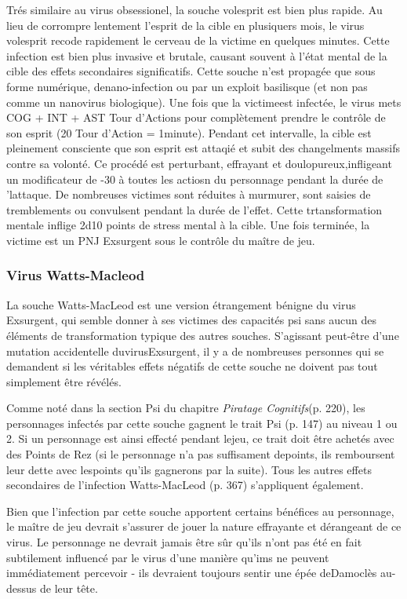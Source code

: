 Trés similaire au virus obsessionel, la souche volesprit est bien plus rapide. Au lieu de corrompre lentement l'esprit de la cible en plusiquers mois, le virus volesprit recode rapidement le cerveau de la victime en quelques minutes. Cette infection est  bien plus invasive et brutale, causant souvent à l'état mental de la cible des effets secondaires significatifs. Cette souche n'est propagée que sous forme numérique, denano-infection ou par un exploit basilisque (et non pas comme un nanovirus biologique). Une fois que la victimeest infectée, le virus mets COG + INT + AST Tour d'Actions pour complètement prendre le contrôle de son esprit (20 Tour d'Action =  1minute). Pendant cet intervalle, la cible est pleinement consciente que son esprit est attaqié et subit des changelments massifs contre sa volonté. Ce procédé est perturbant, effrayant et doulopureux,infligeant un modificateur de -30 à toutes les actiosn du personnage pendant la durée de 'lattaque. De nombreuses victimes sont réduites à murmurer, sont saisies de tremblements ou convulsent pendant la durée de l'effet. Cette trtansformation mentale inflige 2d10 points de stress mental à la cible. Une fois terminée, la victime est un PNJ Exsurgent sous le contrôle du maître de jeu. 

\subsubsection{Virus Watts-Macleod} 

La souche Watts-MacLeod est une version étrangement bénigne du virus Exsurgent, qui semble donner à ses victimes des capacités psi sans aucun des éléments de transformation typique des autres souches. S'agissant peut-être d'une mutation accidentelle duvirusExsurgent, il y a de nombreuses personnes qui se demandent si les véritables effets négatifs de cette souche ne doivent pas tout simplement être révélés. 

Comme noté dans la section Psi du chapitre \textit{Piratage Cognitifs}(p. 220), les personnages infectés par cette souche gagnent le trait Psi (p. 147) au niveau 1 ou 2. Si un personnage est ainsi effecté pendant lejeu, ce trait doit être achetés avec des Points de Rez (si le personnage n'a pas suffisament depoints, ils remboursent leur dette avec lespoints qu'ils gagnerons par la suite). Tous les autres effets secondaires de l'infection Watts-MacLeod (p. 367) s'appliquent également. 

Bien que l'infection par cette souche apportent certains bénéfices au personnage, le maître de jeu devrait s'assurer de jouer la nature effrayante et dérangeant de ce virus. Le personnage ne devrait jamais être sûr qu'ils n'ont pas été en fait subtilement influencé par le virus d'une manière qu'ims ne peuvent immédiatement percevoir - ils devraient toujours sentir une épée deDamoclès au-dessus de leur tête. 

